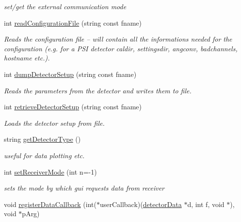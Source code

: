 \begin{CompactItemize}
\begin{CompactList}\small\item\em set/get the external communication mode \item\end{CompactList}\item 
int \hyperlink{classslsDetectorUsers_8aeda7c2cbc270c7f8756761823e8d95}{read\-Configuration\-File} (string const fname)
\begin{CompactList}\small\item\em Reads the configuration file -- will contain all the informations needed for the configuration (e.g. for a PSI detector caldir, settingsdir, angconv, badchannels, hostname etc.). \item\end{CompactList}\item 
int \hyperlink{classslsDetectorUsers_d6b968f4d520342324762c496ebeb481}{dump\-Detector\-Setup} (string const fname)
\begin{CompactList}\small\item\em Reads the parameters from the detector and writes them to file. \item\end{CompactList}\item 
int \hyperlink{classslsDetectorUsers_8769c8ea5020b43dc3557c86f9e4159b}{retrieve\-Detector\-Setup} (string const fname)
\begin{CompactList}\small\item\em Loads the detector setup from file. \item\end{CompactList}\item 
string \hyperlink{classslsDetectorUsers_5292a3d9c12696512b81bcc6c579a03c}{get\-Detector\-Type} ()
\begin{CompactList}\small\item\em useful for data plotting etc. \item\end{CompactList}\item 
int \hyperlink{classslsDetectorUsers_db084473ffe61960b86abdfa8efcc80d}{set\-Receiver\-Mode} (int n=-1)
\begin{CompactList}\small\item\em sets the mode by which gui requests data from receiver \item\end{CompactList}\item 
void \hyperlink{classslsDetectorUsers_4a1db91fc49fc1710f98ce98e33bc16b}{register\-Data\-Callback} (int($\ast$user\-Callback)(\hyperlink{classdetectorData}{detector\-Data} $\ast$d, int f, void $\ast$), void $\ast$p\-Arg)

\end{CompactItemize}
